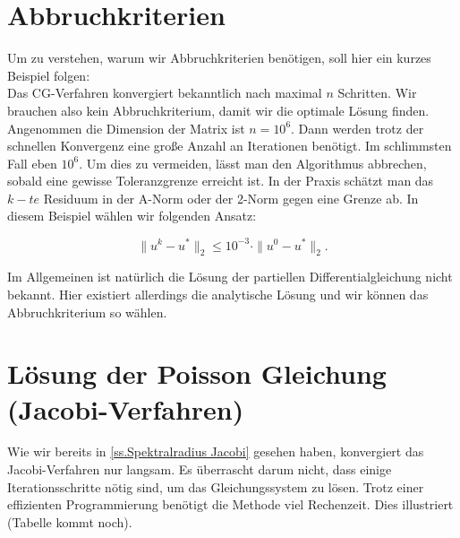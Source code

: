 \section{Abbruchkriterien}

Um zu verstehen, warum wir Abbruchkriterien benötigen, soll hier ein kurzes Beispiel folgen:\\
Das CG-Verfahren konvergiert bekanntlich nach maximal $n$ Schritten. Wir brauchen also kein Abbruchkriterium, damit wir die optimale Lösung finden. Angenommen die Dimension der Matrix ist $n = 10^{6}$. Dann werden trotz der schnellen Konvergenz eine große Anzahl an Iterationen benötigt. Im schlimmsten Fall eben $10^{6}$. Um dies zu vermeiden, lässt man den Algorithmus abbrechen, sobald eine gewisse Toleranzgrenze erreicht ist. In der Praxis schätzt man das $k-te$ Residuum in der A-Norm oder der 2-Norm gegen eine Grenze ab. In diesem Beispiel wählen wir folgenden Ansatz:

\begin{equation}
\| u^{k} - u^{*} \|_{2} \le 10^{-3} \cdot \| u^{0} - u^{*} \|_{2}.
\end{equation}

Im Allgemeinen ist natürlich die Lösung der partiellen Differentialgleichung nicht bekannt. Hier existiert allerdings die analytische Lösung und wir können das Abbruchkriterium so wählen.

\section{Lösung der Poisson Gleichung (Jacobi-Verfahren)}\label{s.Jacobi mit Beispiel}

Wie wir bereits in \autoref{ss.Spektralradius Jacobi} gesehen haben, konvergiert das Jacobi-Verfahren nur langsam. Es überrascht darum nicht, dass einige Iterationsschritte nötig sind, um das Gleichungssystem zu lösen. Trotz einer effizienten Programmierung benötigt die Methode viel Rechenzeit. Dies illustriert (Tabelle kommt noch).




